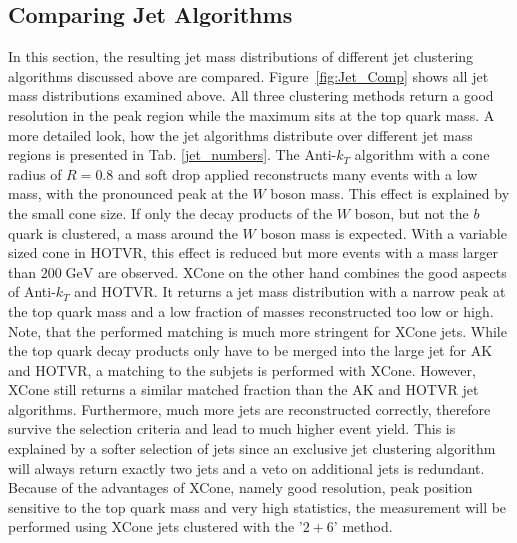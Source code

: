 \FloatBarrier %
\subsection{Comparing Jet Algorithms}
\label{sec:jet_comp}
	In this section, the resulting jet mass distributions of different jet clustering algorithms discussed above are compared. Figure~\ref{fig:Jet_Comp} shows all jet mass distributions examined above. All three clustering methods return a good resolution in the peak region while the maximum sits at the top quark mass. A more detailed look, how the jet algorithms distribute over different jet mass regions is presented in Tab. \ref{jet_numbers}. The Anti-$k_T$ algorithm with a cone radius of $R=0.8$ and soft drop applied reconstructs many events with a low mass, with the pronounced peak at the $W$ boson mass. This effect is explained by the small cone size. If only the decay products of the $W$ boson, but not the $b$ quark is clustered, a mass around the $W$ boson mass is expected. With a variable sized cone in HOTVR, this effect is reduced but more events with a mass larger than $200\;\text{GeV}$ are observed. XCone on the other hand combines the good aspects of Anti-$k_T$ and HOTVR. It returns a jet mass distribution with a narrow peak at the top quark mass and a low fraction of masses reconstructed too low or high. Note, that the performed matching is much more stringent for XCone jets. While the top quark decay products only have to be merged into the large jet for AK and HOTVR, a matching to the subjets is performed with XCone. However, XCone still returns a similar matched fraction than the AK and HOTVR jet algorithms.  Furthermore, much more jets are reconstructed correctly, therefore survive the selection criteria and lead to much higher event yield. This is explained by a softer selection of jets since an exclusive jet clustering algorithm will always return exactly two jets and a veto on additional jets is redundant. Because of the advantages of XCone, namely good resolution, peak position sensitive to the top quark mass and very high statistics, the measurement will be performed using XCone jets clustered with the '$2+6$' method.
	
